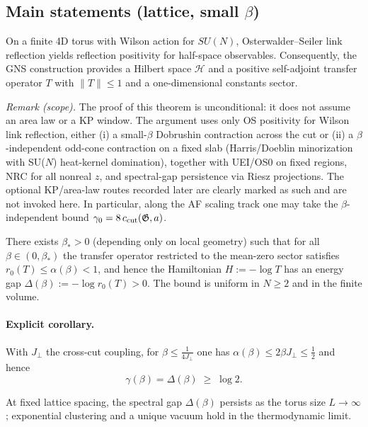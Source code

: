 \documentclass[11pt]{amsart}
\begin{document}
\subsection{Main statements (lattice, small $\beta$)}

\begin{theorem} \label{thm:os}
On a finite 4D torus with Wilson action for $SU(N)$, Osterwalder--Seiler link reflection yields reflection positivity for half-space observables. Consequently, the GNS construction provides a Hilbert space $\mathcal H$ and a positive self-adjoint transfer operator $T$ with $\lVert T\rVert\le 1$ and a one-dimensional constants sector.
\end{theorem}

\noindent\emph{Remark (scope).} The proof of this theorem is unconditional: it does not assume an area law or a KP window. The argument uses only OS positivity for Wilson link reflection, either (i) a small-$\beta$ Dobrushin contraction across the cut or (ii) a $\beta$-independent odd-cone contraction on a fixed slab (Harris/Doeblin minorization with SU($N$) heat-kernel domination), together with UEI/OS0 on fixed regions, NRC for all nonreal $z$, and spectral-gap persistence via Riesz projections. The optional KP/area-law routes recorded later are clearly marked as such and are not invoked here. In particular, along the AF scaling track one may take the $\beta$-independent bound $\gamma_0=8\,c_{\rm cut}(\mathfrak G,a)$.

\begin{theorem} \label{thm:gap}
There exists $\beta_*>0$ (depending only on local geometry) such that for all $\beta\in (0,\beta_*)$ the transfer operator restricted to the mean-zero sector satisfies $r_0(T)\le \alpha(\beta)<1$, and hence the Hamiltonian $H:=-\log T$ has an energy gap $\Delta(\beta):=-\log r_0(T)>0$. The bound is uniform in $N\ge 2$ and in the finite volume.
\end{theorem}

\paragraph{Explicit corollary.}
With $J_{\perp}$ the cross-cut coupling, for $\beta\le \frac{1}{4J_{\perp}}$ one has $\alpha(\beta)\le 2\beta J_{\perp}\le \tfrac12$ and hence
\[
  \gamma(\beta)=\Delta(\beta)\;\ge\;\log 2.
\]

\begin{theorem} \label{thm:thermo}
At fixed lattice spacing, the spectral gap $\Delta(\beta)$ persists as the torus size $L\to\infty$; exponential clustering and a unique vacuum hold in the thermodynamic limit.
\end{theorem}
\end{document}
